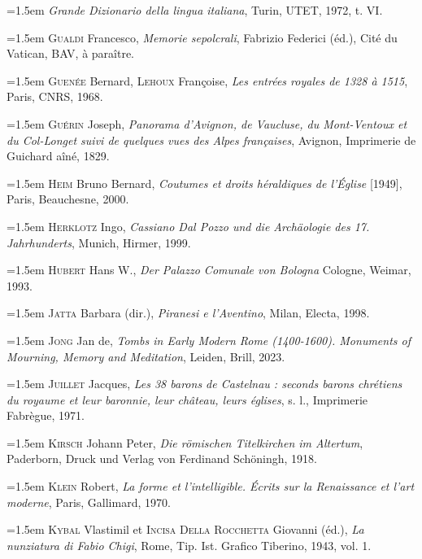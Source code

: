 \documentclass[12pt,twoside,openany]{book}
\newenvironment{PurhBibliography}
  {%
    \par
    \setlength{\parindent}{0pt}%
    \setlength{\leftskip}{0pt}%
  }
  {%
    \par
  }
\begin{document}
\begin{PurhBibliography}
\noindent\hangindent=1.5em \textit{Grande Dizionario della lingua italiana}, Turin, \textsc{UTET}, 1972, t. \textsc{VI}.\par
\noindent\hangindent=1.5em \textsc{Gualdi} Francesco, \textit{Memorie sepolcrali}, Fabrizio Federici (éd.), Cité du Vatican, BAV, à paraître.\par
\noindent\hangindent=1.5em \textsc{Guenée} Bernard, \textsc{Lehoux} Françoise, \textit{Les entrées royales de 1328 à 1515}, Paris, \textsc{CNRS}, 1968. \par
\noindent\hangindent=1.5em \textsc{Guérin} Joseph, \textit{Panorama d’Avignon, de Vaucluse, du Mont-Ventoux et du Col-Longet suivi de quelques vues des Alpes françaises}, Avignon, Imprimerie de Guichard aîné, 1829.\par
\noindent\hangindent=1.5em \textsc{Heim} Bruno Bernard,\textit{ Coutumes et droits héraldiques de l’Église} [1949], Paris, Beauchesne, 2000.\par
\noindent\hangindent=1.5em \textsc{Herklotz} Ingo, \textit{Cassiano Dal Pozzo und die Archäologie des 17. Jahrhunderts}, Munich, Hirmer, 1999.\par
\noindent\hangindent=1.5em \textsc{Hubert} Hans W., \textit{Der Palazzo Comunale von Bologna} Cologne, Weimar, 1993.\par
\noindent\hangindent=1.5em \textsc{Jatta} Barbara (dir.), \textit{Piranesi e l’Aventino}, Milan, Electa, 1998.\par
\noindent\hangindent=1.5em \textsc{Jong} Jan de, \textit{Tombs in Early Modern Rome (1400-1600). Monuments of Mourning, Memory and Meditation}, Leiden, Brill, 2023.\par
\noindent\hangindent=1.5em \textsc{Juillet} Jacques, \textit{Les 38 barons de Castelnau : seconds barons chrétiens du royaume et leur baronnie, leur château, leurs églises}, s. l., Imprimerie Fabrègue, 1971.\par
\noindent\hangindent=1.5em \textsc{Kirsch} Johann Peter, \textit{Die römischen Titelkirchen im Altertum}, Paderborn, Druck und Verlag von Ferdinand Schöningh, 1918.\par
\noindent\hangindent=1.5em \textsc{Klein} Robert, \textit{La forme et l’intelligible. Écrits sur la Renaissance et l’art moderne}, Paris, Gallimard, 1970.\par
\noindent\hangindent=1.5em \textsc{Kybal} Vlastimil et \textsc{Incisa Della Rocchetta} Giovanni (éd.), \textit{La nunziatura di Fabio Chigi}, Rome, Tip. Ist. Grafico Tiberino, 1943, vol. 1.\par

\end{PurhBibliography}
\end{document}
